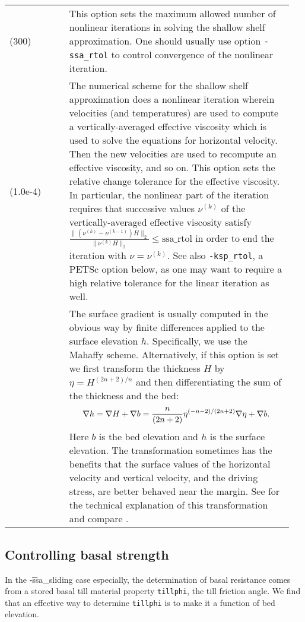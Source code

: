\begin{center}
\begin{xtabular}{p{0.2\linewidth}p{0.75\linewidth}}
 (300) & This option sets the maximum allowed number of nonlinear iterations in solving the shallow shelf approximation.  One should usually use option \texttt{-ssa_rtol} to control convergence of the nonlinear iteration.\\
 (1.0e-4) & The numerical scheme for the shallow shelf approximation \cite{WeisGreveHutter} does a nonlinear iteration wherein velocities (and temperatures) are used to compute a vertically-averaged effective viscosity which is used to solve the equations for horizontal velocity.  Then the new velocities are used to recompute an effective viscosity, and so on.  This option sets the relative change tolerance for the effective viscosity.
In particular, the nonlinear part of the iteration requires that successive values $\nu^{(k)}$ of the vertically-averaged effective viscosity satisfy
	$\frac{\|(\nu^{(k)} - \nu^{(k-1)}) H\|_2}{\|\nu^{(k)} H\|_2} \le \text{ssa_rtol}$
in order to end the iteration with $\nu = \nu^{(k)}$.  See also \texttt{-ksp_rtol}, a PETSc option below, as one may want to require a high relative tolerance for the linear iteration as well.\\
 & The surface gradient is usually computed in the obvious way by finite differences applied to the surface elevation $h$.  Specifically, we use the Mahaffy \cite{Mahaffy} scheme.  Alternatively, if this option is set we first transform the thickness $H$ by $\eta = H^{(2n+2)/n}$ and then differentiating the sum of the thickness and the bed:
	$$\nabla h = \nabla H + \nabla b = \frac{n}{(2n+2)} \eta^{(-n-2)/(2n+2)} \nabla \eta + \nabla b.$$
Here $b$ is the bed elevation and $h$ is the surface elevation.  The transformation sometimes has the benefits that the surface values of the horizontal velocity and vertical velocity, and the driving stress, are better behaved near the margin.  See \cite{CDDSV} for the technical explanation of this transformation and compare \cite{SaitoMargin}.\\
\end{xtabular}
\end{center}



\subsection{Controlling basal strength}  \label{subsect:basestrength}

In the \t{-ssa_sliding} case especially, the determination of basal resistance comes from a stored basal till material property \texttt{tillphi}, the till friction angle.  We find that an effective way to determine \texttt{tillphi} is to make it a function of bed elevation.

